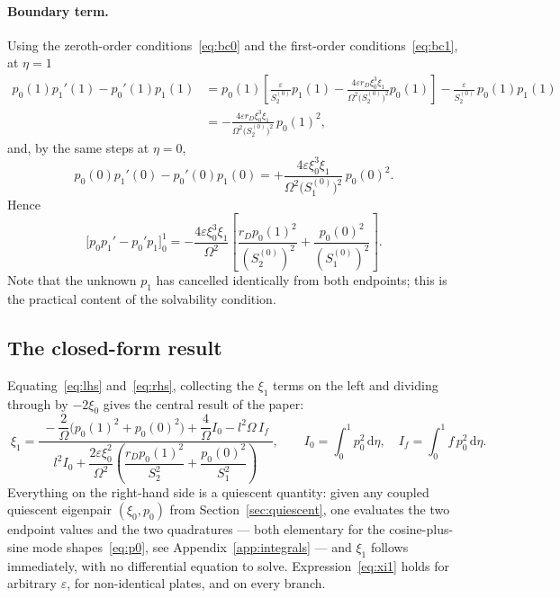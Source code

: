 \documentclass[11pt,a4paper]{article}
\newcommand{\Om}{\Omega}
\newcommand{\eps}{\varepsilon}
\newcommand{\dd}{\mathrm{d}}
\theoremstyle{plain}
\theoremstyle{remark}
\begin{document}
\paragraph{Boundary term.} Using the zeroth-order conditions~\eqref{eq:bc0} and the first-order
conditions~\eqref{eq:bc1}, at $\eta=1$
\begin{equation}
\begin{aligned}
p_0(1)p_1'(1)-p_0'(1)p_1(1)
&=p_0(1)\!\left[\frac{\eps}{S_2^{(0)}}p_1(1)
-\frac{4\eps r_D\xi_0^3\xi_1}{\Om^2\bigl(S_2^{(0)}\bigr)^2}p_0(1)\right]
-\frac{\eps}{S_2^{(0)}}\,p_0(1)p_1(1)\\
&=-\frac{4\eps r_D\xi_0^3\xi_1}{\Om^2\bigl(S_2^{(0)}\bigr)^2}\,p_0(1)^2,
\end{aligned}
\end{equation}
and, by the same steps at $\eta=0$,
\begin{equation}
p_0(0)p_1'(0)-p_0'(0)p_1(0)
=+\frac{4\eps\xi_0^3\xi_1}{\Om^2\bigl(S_1^{(0)}\bigr)^2}\,p_0(0)^2 .
\end{equation}
Hence
\begin{equation}
\bigl[p_0p_1'-p_0'p_1\bigr]_0^1
=-\frac{4\eps\xi_0^3\xi_1}{\Om^2}
\left[\frac{r_Dp_0(1)^2}{(S_2^{(0)})^2}+\frac{p_0(0)^2}{(S_1^{(0)})^2}\right].
\label{eq:lhs}
\end{equation}
Note that the unknown $p_1$ has cancelled identically from both endpoints; this is the practical
content of the solvability condition.

\subsection{The closed-form result}
Equating~\eqref{eq:lhs} and~\eqref{eq:rhs}, collecting the $\xi_1$ terms on the left and dividing
through by $-2\xi_0$ gives the central result of the paper:
\begin{equation}
\boxed{\;
\xi_1=\dfrac{\;-\dfrac{2}{\Om}\bigl(p_0(1)^2+p_0(0)^2\bigr)
+\dfrac{4}{\Om}I_0-l^2\Om\,I_f\;}
{\;l^2I_0+\dfrac{2\eps\xi_0^2}{\Om^2}
\left(\dfrac{r_Dp_0(1)^2}{S_2^2}+\dfrac{p_0(0)^2}{S_1^2}\right)\;},
\qquad
I_0=\int_0^1p_0^2\,\dd\eta,\quad I_f=\int_0^1f\,p_0^2\,\dd\eta .\;}
\label{eq:xi1}
\end{equation}
Everything on the right-hand side is a quiescent quantity: given any coupled quiescent eigenpair
$(\xi_0,p_0)$ from Section~\ref{sec:quiescent}, one evaluates the two endpoint values and the two
quadratures --- both elementary for the cosine-plus-sine mode shapes~\eqref{eq:p0}, see
Appendix~\ref{app:integrals} --- and $\xi_1$ follows immediately, with no differential equation to
solve. Expression~\eqref{eq:xi1} holds for arbitrary $\eps$, for non-identical plates, and on every
branch.
\end{document}
